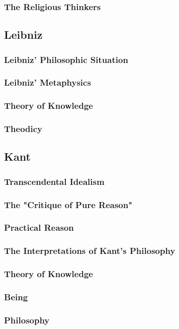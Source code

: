 \documentclass[a4paper,11pt]{article}
\begin{document}
\subsubsection{The Religious Thinkers}
\subsection{Leibniz}
\subsubsection{Leibniz' Philosophic Situation}
\subsubsection{Leibniz' Metaphysics}
\subsubsection{Theory of Knowledge}
\subsubsection{Theodicy}
\subsection{Kant}
\subsubsection{Transcendental Idealism}
\subsubsection{The "Critique of Pure Reason"}
\subsubsection{Practical Reason}
\subsubsection{The Interpretations of Kant's Philosophy}
\subsubsection{Theory of Knowledge}
\subsubsection{Being}
\subsubsection{Philosophy}
\end{document}
